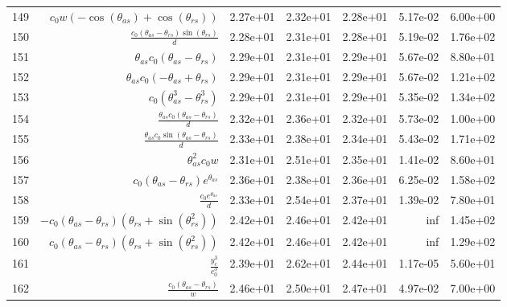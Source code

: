 \begin{tabularx}{\textwidth}{lRRRRRl}
149  &  $ c_{0} w \left(- \cos{\left(\theta_{as} \right)} + \cos{\left(\theta_{rs} \right)}\right) $  &  2.27e+01  &  2.32e+01  &  2.28e+01  &  5.17e-02  &  6.00e+00  \\ 
150  &  $ \displaystyle\frac{c_{0} \left(\theta_{as} - \theta_{rs}\right) \sin{\left(\theta_{rs} \right)}}{d} $  &  2.28e+01  &  2.31e+01  &  2.28e+01  &  5.19e-02  &  1.76e+02  \\ 
151  &  $ \theta_{as} c_{0} \left(\theta_{as} - \theta_{rs}\right) $  &  2.29e+01  &  2.31e+01  &  2.29e+01  &  5.67e-02  &  8.80e+01  \\ 
152  &  $ \theta_{as} c_{0} \left(- \theta_{as} + \theta_{rs}\right) $  &  2.29e+01  &  2.31e+01  &  2.29e+01  &  5.67e-02  &  1.21e+02  \\ 
153  &  $ c_{0} \left(\theta_{as}^{3} - \theta_{rs}^{3}\right) $  &  2.29e+01  &  2.31e+01  &  2.29e+01  &  5.35e-02  &  1.34e+02  \\ 
154  &  $ \displaystyle\frac{\theta_{as} c_{0} \left(\theta_{as} - \theta_{rs}\right)}{d} $  &  2.32e+01  &  2.36e+01  &  2.32e+01  &  5.73e-02  &  1.00e+00  \\ 
155  &  $ \displaystyle\frac{\theta_{as} c_{0} \sin{\left(\theta_{as} - \theta_{rs} \right)}}{d} $  &  2.33e+01  &  2.38e+01  &  2.34e+01  &  5.43e-02  &  1.71e+02  \\ 
156  &  $ \theta_{as}^{2} c_{0} w $  &  2.31e+01  &  2.51e+01  &  2.35e+01  &  1.41e-02  &  8.60e+01  \\ 
157  &  $ c_{0} \left(\theta_{as} - \theta_{rs}\right) e^{\theta_{as}} $  &  2.36e+01  &  2.38e+01  &  2.36e+01  &  6.25e-02  &  1.58e+02  \\ 
158  &  $ \displaystyle\frac{c_{0} e^{\theta_{as}}}{d} $  &  2.33e+01  &  2.54e+01  &  2.37e+01  &  1.39e-02  &  7.80e+01  \\ 
159  &  $ - c_{0} \left(\theta_{as} - \theta_{rs}\right) \left(\theta_{rs} + \sin{\left(\theta_{rs}^{2} \right)}\right) $  &  2.42e+01  &  2.46e+01  &  2.42e+01  &  inf  &  1.45e+02  \\ 
160  &  $ c_{0} \left(\theta_{as} - \theta_{rs}\right) \left(\theta_{rs} + \sin{\left(\theta_{rs}^{2} \right)}\right) $  &  2.42e+01  &  2.46e+01  &  2.42e+01  &  inf  &  1.29e+02  \\ 
161  &  $ \displaystyle\frac{y_c^{3}}{c_{0}^{3}} $  &  2.39e+01  &  2.62e+01  &  2.44e+01  &  1.17e-05  &  5.60e+01  \\ 
162  &  $ \displaystyle\frac{c_{0} \left(\theta_{as} - \theta_{rs}\right)}{w} $  &  2.46e+01  &  2.50e+01  &  2.47e+01  &  4.97e-02  &  7.00e+00  \\ 

\end{tabularx}
